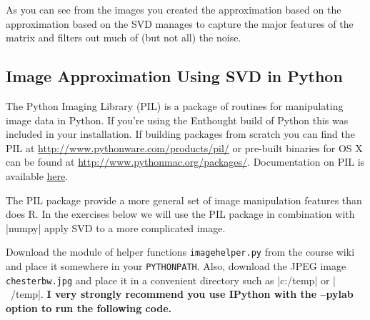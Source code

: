 \documentclass[11pt,letterpaper]{article}
\begin{document}
As you can see from the images you created the approximation based on the approximation based on the SVD manages to capture the major features of the matrix and filters out much of (but not all) the noise.

\subsection*{Image Approximation Using SVD in Python}

The Python Imaging Library (PIL) is a package of routines for manipulating image data in Python. If you're using the Enthought build of Python this was included in your installation. If building packages from scratch you can find the PIL at \href{http://www.pythonware.com/products/pil/}{http://www.pythonware.com/products/pil/} or pre-built binaries for OS X can be found at \href{http://www.pythonmac.org/packages/}{http://www.pythonmac.org/packages/}. Documentation on PIL is available \href{http://www.pythonware.com/library/pil/handbook/index.htm}{here}.

The PIL package provide a more general set of image manipulation features than does R.  In the exercises below we will use the PIL package in combination with |numpy| apply SVD to a more complicated image.

Download the module of helper functions \texttt{imagehelper.py} from the course wiki and place it somewhere in your \texttt{PYTHONPATH}. Also, download the JPEG image \texttt{chesterbw.jpg} and place it in a convenient directory such as |c:/temp| or |~/temp|. {\color{red} \bfseries I very strongly recommend you use IPython with the --pylab option to run the following code.}
\end{document}
